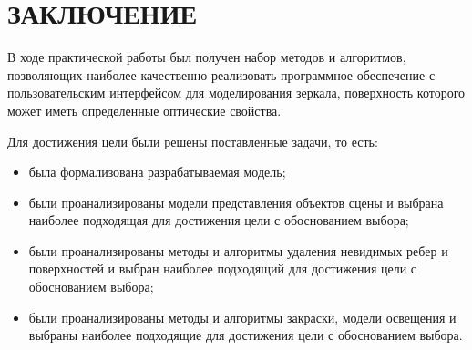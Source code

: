 \chapter*{ЗАКЛЮЧЕНИЕ}
{}

В ходе практической работы был получен набор методов и алгоритмов, позволяющих наиболее качественно реализовать программное обеспечение с пользовательским интерфейсом для моделирования зеркала, поверхность которого может иметь определенные оптические свойства.

Для достижения цели были решены поставленные задачи, то есть:

\begin{itemize}
    \item была формализована разрабатываемая модель;
    \item были проанализированы модели представления объектов сцены и выбрана наиболее подходящая для достижения цели с обоснованием выбора;
    \item были проанализированы методы и алгоритмы удаления невидимых ребер и поверхностей и выбран наиболее подходящий для достижения цели с обоснованием выбора;
    \item были проанализированы методы и алгоритмы закраски, модели освещения и выбраны наиболее подходящие для достижения цели с обоснованием выбора.
\end{itemize}